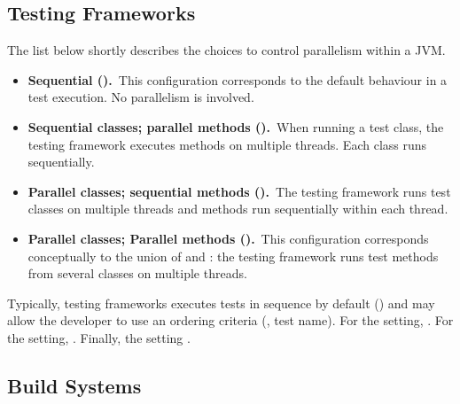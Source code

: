 

\subsection{Testing Frameworks}
\label{sec:frameworks}

The list below shortly describes the choices to control parallelism
within a JVM.

\begin{itemize}
\item
    \textbf{Sequential (\Seq).}~This configuration corresponds to the
        default behaviour in a test execution. No parallelism is
        involved.
\item
    \textbf{Sequential classes; parallel methods
        (\SeqClassParMeth).}~When running a test class, the testing
        framework executes methods on multiple threads. Each class
        runs sequentially.
\item
    \textbf{Parallel classes; sequential methods
        (\ParClassSeqMeth{}).}~The testing framework runs test classes
        on multiple threads and methods run sequentially within each
        thread.
\item
    \textbf{Parallel classes; Parallel methods
        (\ParClassParMeth).}~This configuration corresponds
        conceptually to the union of \ParClassSeqMeth{} and
        \SeqClassParMeth{}: the testing framework runs test methods
        from several classes on multiple threads.
\end{itemize}

Typically, testing frameworks executes tests in sequence by default
(\Seq{}) and may allow the developer to use an ordering criteria (\eg,
test name).  For the \SeqClassParMeth{} setting, .
For the \ParClassSeqMeth{} setting, . Finally, the
\ParClassParMeth{} setting .

\subsection{Build Systems}
\label{sec:builder}

